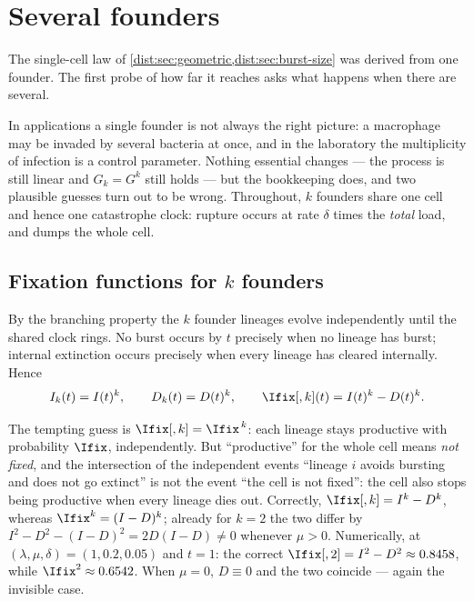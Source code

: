 \section{Several founders}
\label{dist:sec:moi}

The single-cell law of \cref{dist:sec:geometric,dist:sec:burst-size} was
derived from one founder. The first probe of how far it reaches asks what
happens when there are several.

In applications a single founder is not always the right picture: a
macrophage may be invaded by several bacteria at once, and in the laboratory
the multiplicity of infection is a control parameter. Nothing essential
changes --- the process is still linear and $G_k=G^k$ still holds --- but the
bookkeeping does, and two plausible guesses turn out to be wrong. Throughout,
$k$ founders share one cell and hence one catastrophe clock: rupture occurs at
rate $\delta$ times the \emph{total} load, and dumps the whole cell.

\subsection{Fixation functions for \texorpdfstring{$k$}{k} founders}
\label{dist:sec:moi-fixation}

By the branching property the $k$ founder lineages evolve independently until
the shared clock rings. No burst occurs by $t$ precisely when no lineage has
burst; internal extinction occurs precisely when every lineage has cleared
internally. Hence
\begin{equation}
I_k(t)=I(t)^k,\qquad
D_k(t)=D(t)^k,\qquad
\Ifix[,{k}](t)=I(t)^k-D(t)^k.
\label{dist:eq:ihatk}
\end{equation}

\begin{remark}
\label{dist:rem:ihatk}
The tempting guess is $\Ifix[,{k}]=\Ifix^{\,k}$: each lineage stays productive
with probability $\Ifix$, independently. But ``productive'' for the whole
cell means \emph{not fixed}, and the intersection of the independent events
``lineage $i$ avoids bursting and does not go extinct'' is not the event
``the cell is not fixed'': the cell also stops being productive when every
lineage dies out. Correctly, $\Ifix[,{k}]=I^k-D^k$, whereas
$\Ifix^k=(I-D)^k$; already for $k=2$ the two differ by
$I^2-D^2-(I-D)^2=2D(I-D)\neq0$ whenever $\mu>0$. Numerically, at
$(\lambda,\mu,\delta)=(1,0.2,0.05)$ and $t=1$: the correct
$\Ifix[,{2}]=I^2-D^2\approx0.8458$, while $\Ifix^2\approx0.6542$. When $\mu=0$,
$D\equiv0$ and the two coincide --- again the invisible case.
\end{remark}

